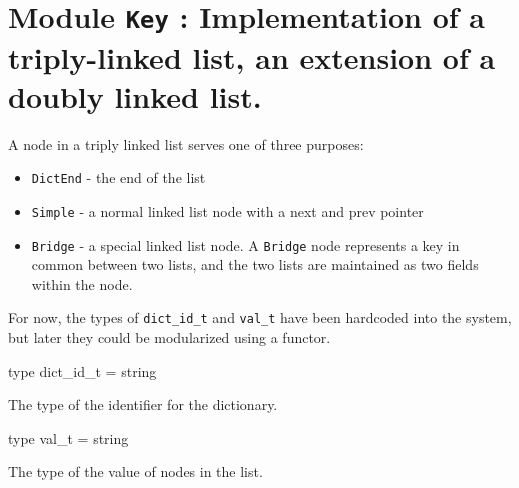 \documentclass[11pt]{article}
\begin{document}
\tableofcontents
\section{Module {\tt{Key}} : Implementation of a triply-linked list, an extension of a doubly linked
    list.}
\label{module:Key}
 A node in a triply linked list serves one of three purposes:


    \begin{itemize}
\item {\tt{DictEnd}} - the end of the list
\item {\tt{Simple}} - a normal linked list node with a next and prev pointer
\item {\tt{Bridge}} - a special linked list node. A {\tt{Bridge}} node represents a key
    in common between two lists, and the two lists are maintained as two
    fields within the node.
\end{itemize}



    For now, the types of {\tt{dict\_id\_t}} and {\tt{val\_t}} have been hardcoded into
    the system, but later they could be modularized using a functor.



\ocamldocvspace{0.5cm}



\label{type:Key.dict-underscoreid-underscoret}\begin{ocamldoccode}
type dict_id_t = string 
\end{ocamldoccode}
\begin{ocamldocdescription}
The type of the identifier for the dictionary.


\end{ocamldocdescription}




\label{type:Key.val-underscoret}\begin{ocamldoccode}
type val_t = string 
\end{ocamldoccode}
\begin{ocamldocdescription}
The type of the value of nodes in the list.


\end{ocamldocdescription}
\end{document}
